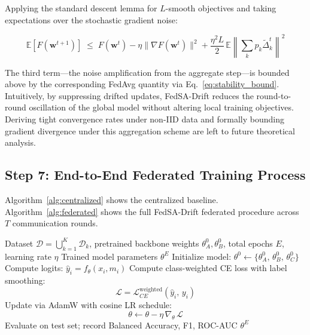\documentclass[utf8]{FrontiersinHarvard} %
\newcommand{\sadrift}{FedSA-Drift}
\begin{document}
Applying the standard descent lemma for $L$-smooth objectives and taking expectations over the stochastic gradient noise:

\begin{equation}
\label{eq:convergence}
\mathbb{E}[F(\mathbf{w}^{t+1})]
\;\le\;
F(\mathbf{w}^t)
- \eta \|\nabla F(\mathbf{w}^t)\|^2
+ \frac{\eta^2 L}{2}\,\mathbb{E}\!\left\|\sum_k p_k \tilde{\Delta}_k^t\right\|^2
\end{equation}

The third term—the noise amplification from the aggregate step—is bounded above by the corresponding FedAvg quantity via Eq.~\eqref{eq:stability_bound}. Intuitively, by suppressing drifted updates, \sadrift{} reduces the round-to-round oscillation of the global model without altering local training objectives. Deriving tight convergence rates under non-IID data and formally bounding gradient divergence under this aggregation scheme are left to future theoretical analysis.

\subsection{Step 7: End-to-End Federated Training Process}

Algorithm~\ref{alg:centralized} shows the centralized baseline. Algorithm~\ref{alg:federated} shows the full \sadrift{} federated procedure across $T$ communication rounds.

\begin{algorithm}[t]
\caption{Centralized Training Baseline}
\label{alg:centralized}
\begin{algorithmic}[1]
\REQUIRE Dataset $\mathcal{D} = \bigcup_{k=1}^{K} \mathcal{D}_k$, pretrained backbone weights $\theta_A^0, \theta_B^0$, total epochs $E$, learning rate $\eta$
\ENSURE Trained model parameters $\theta^E$
\STATE Initialize model: $\theta^0 \leftarrow \{\theta_A^0,\, \theta_B^0,\, \theta_C^0\}$
        \STATE Compute logits: $\hat{y}_i = f_\theta(x_i, m_i)$
        \STATE Compute class-weighted CE loss with label smoothing:
               \[ \mathcal{L} = \mathcal{L}_{CE}^{\text{weighted}}(\hat{y}_i,\, y_i) \]
        \STATE Update via AdamW with cosine LR schedule:
               \[ \theta \leftarrow \theta - \eta\,\nabla_\theta\,\mathcal{L} \]
    \ENDFOR
    \STATE Evaluate on test set; record Balanced Accuracy, F1, ROC-AUC
\ENDFOR
\RETURN $\theta^E$
\end{algorithmic}
\end{algorithm}
\end{document}
